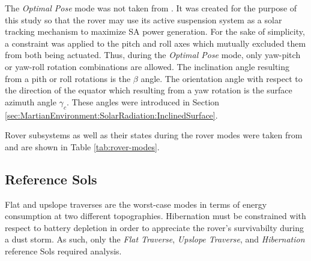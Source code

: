 
The \textit{Optimal Pose} mode was not taken from . It was created for the purpose of this study so that the rover may use its active suspension system as a solar tracking mechanism to maximize \ac{SA} power generation. For the sake of simplicity, a constraint was applied to the pitch and roll axes which mutually excluded them from both being actuated. Thus, during the \textit{Optimal Pose} mode, only yaw-pitch or yaw-roll rotation combinations are allowed. The inclination angle resulting from a pith or roll rotations is the $\beta$ angle. The orientation angle with respect to the direction of the equator which resulting from a yaw rotation is the surface azimuth angle $\gamma_{c}$. These angles were introduced in Section \ref{sec:MartianEnvironment:SolarRadiation:InclinedSurface}.

Rover subsystems as well as their states during the rover modes were taken from  and are shown in Table \ref{tab:rover-modes}.






\subsection{Reference Sols}
\label{sec:ReferenceSols:ReferenceSols}
Flat and upslope traverses are the worst-case modes in terms of energy consumption at two different topographies. Hibernation must be constrained with respect to battery depletion in order to appreciate the rover's survivabilty during a dust storm. As such, only the \textit{Flat Traverse}, \textit{Upslope Traverse}, and \textit{Hibernation} reference Sols required analysis.


